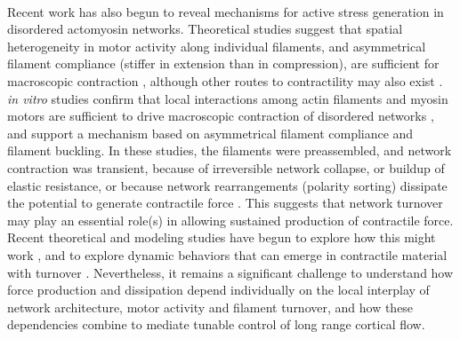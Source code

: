 \documentclass[10pt,letterpaper]{article}
\begin{document}
\paragraph{} Recent work has also begun to reveal mechanisms for active stress generation in disordered actomyosin networks. Theoretical studies suggest that spatial heterogeneity in motor activity along individual filaments, and asymmetrical filament compliance (stiffer in extension than in compression), are sufficient for macroscopic contraction \cite{1367-2630-14-3-033037,PhysRevX.4.041002}, although other routes to contractility may also exist \cite{PhysRevX.4.041002}. {\em in vitro} studies confirm that local interactions among actin filaments and myosin motors are sufficient to drive macroscopic contraction of disordered networks \cite{rheo_2D1}, and support a mechanism based on asymmetrical filament compliance and filament buckling.  In these studies, the filaments were preassembled, and network contraction was transient, because of irreversible network collapse\cite{Alvarado:2013aa}, or buildup of elastic resistance\cite{Murrell15062014}, or because network rearrangements (polarity sorting) dissipate the potential to generate contractile force \cite{Ennomani2016616,Reymann1310,Ndlec:1997aa,Surrey1167}. This suggests that network turnover may play an essential role(s) in allowing sustained production of contractile force. Recent theoretical and modeling studies have begun to explore how this might work \cite{2015arXiv150706182H,Mak:2016aa,10.1371/journal.pone.0000696}, and to explore dynamic behaviors that can emerge in contractile material with turnover \cite{PhysRevLett.103.058102,PhysRevLett.113.148102}. Nevertheless,  it remains a significant challenge to understand how force production and dissipation depend individually on the local interplay of network architecture, motor activity and filament turnover, and how these dependencies combine to mediate tunable control of long range cortical flow. 
\end{document}
